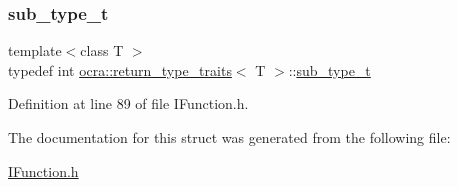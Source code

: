 \subsubsection{\texorpdfstring{sub\+\_\+type\+\_\+t}{sub\_type\_t}}
{\footnotesize\ttfamily template$<$class T $>$ \\
typedef int \hyperlink{structocra_1_1return__type__traits}{ocra\+::return\+\_\+type\+\_\+traits}$<$ T $>$\+::\hyperlink{structocra_1_1return__type__traits_a28ffd04e2ff6d8e8a186c1aeaa89d881}{sub\+\_\+type\+\_\+t}}



Definition at line 89 of file I\+Function.\+h.



The documentation for this struct was generated from the following file\+:\begin{DoxyCompactItemize}
\item 
\hyperlink{IFunction_8h}{I\+Function.\+h}\end{DoxyCompactItemize}
